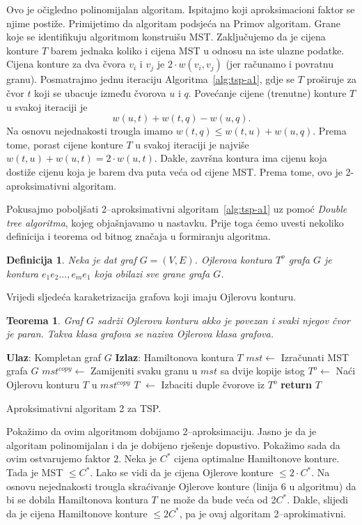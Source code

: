 \documentclass[a4paper, utf8, 11pt, colorlinks]{book}
\newtheorem{definition}{Definicija}
\newtheorem{thm}{Teorema}
\begin{document}
 Ovo je očigledno polinomijalan algoritam. Ispitajmo koji aproksimacioni faktor se 
njime postiže. Primijetimo da algoritam podsjeća na Primov algoritam. Grane koje se identifikuju algoritmom 
konstruišu MST. Zaključujemo da je cijena konture $T$ barem jednaka koliko i cijena MST u odnosu na iste ulazne podatke. Cijena konture za dva čvora $v_i$ i $v_j$ je $2 \cdot w({v_i,v_j})$ (jer računamo i povratnu granu). Posmatrajmo jednu iteraciju Algoritma~\ref{alg:tsp-a1}, gdje se $T$
proširuje za čvor $t$ koji se ubacuje između čvorova  $u$ i $q$. Povećanje cijene (trenutne) konture $T$ u svakoj iteraciji je $$w({u,t}) + w({t,q})-w({u,q}).$$
Na osnovu nejednakosti trougla imamo $ w({t,q}) \leq w({t,u}) + w({u,q})$. Prema tome, porast cijene konture $T$ u svakoj iteraciji je najviše $ w({t, u}) + w({u,t}) = 2\cdot w({u,t})$. 
Dakle, završna kontura ima cijenu koja dostiže cijenu koja je barem dva puta veća od cijene MST. Prema tome, ovo je 2-aproksimativni algoritam. 

 \noindent Pokusajmo poboljšati 2--aproksimativni algoritam~\ref{alg:tsp-a1} uz pomoć \emph{Double tree algoritma}, kojeg objašnjavamo u nastavku. Prije toga ćemo uvesti nekoliko definicija i teorema od bitnog značaja u formiranju algoritma. 
 \begin{definition}
 	  Neka je dat graf $G=(V,E)$. Ojlerova kontura $T^o$ grafa $G$ je kontura $e_1e_2...,e_me_1$ koja obilazi sve grane grafa $G$. 
 \end{definition}
Vrijedi sljedeća karaketrizacija grafova koji imaju Ojlerovu konturu. 
\begin{thm}
	 Graf $G$ sadrži Ojlerovu konturu akko je povezan i svaki njegov čvor je paran. Takva klasa grafova se naziva Ojlerova klasa grafova.
\end{thm}

\begin{algorithm}[H] 
	\begin{algorithmic}[1]
		\STATE \textbf{Ulaz}: Kompletan graf $G$
		\STATE \textbf{Izlaz}: Hamiltonova kontura $T$   
		\STATE $mst \gets$  Izračunati MST grafa $G$
		\STATE $mst^{copy} \gets$ Zamijeniti svaku granu u $mst$ sa dvije kopije istog
		\STATE $T^o \gets$ Naći Ojlerovu konturu $T$ u $mst^{copy}$
		\STATE   $T$ $\gets$ Izbaciti duple čvorove iz $T^o$   
		\STATE \textbf{return} $T$ 
	\end{algorithmic}
   	\caption{Aproksimativni algoritam 2 za TSP.}
   	\label{alg:tsp-a2}
\end{algorithm}
  Pokažimo da ovim algoritmom dobijamo 2--aproksimaciju. Jasno je da je algoritam polinomijalan i da je dobijeno rješenje dopustivo. Pokažimo sada da ovim ostvarujemo faktor $2$.  
  Neka je $C^*$ cijena optimalne Hamiltonove konture. Tada je MST $\leq C^*$. 
  Lako se vidi da je cijena Ojlerove konture  $\leq 2 \cdot C^*$. Na osnovu nejednakosti trougla skraćivanje Ojlerove konture (linija 6 u algoritmu) da bi se dobila Hamiltonova kontura $T$ ne može da bude veća od 2$C^*$. Dakle, slijedi da je cijena Hamiltonove konture $\leq 2 C^*$, pa je ovaj algoritam 2--aprokimativni.
  
\end{document}
